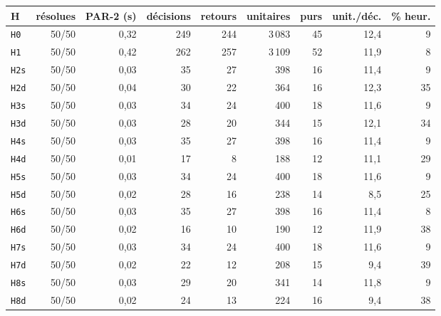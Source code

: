 \begin{tabular}{lrrrrrrrr}
\toprule
H & résolues & PAR-2 (s) & décisions & retours & unitaires & purs & unit./déc. & \% heur. \\
\midrule
\texttt{H0} & 50/50 & 0{,}32 & 249 & 244 & 3\,083 & 45 & 12{,}4 & 9 \\
\texttt{H1} & 50/50 & 0{,}42 & 262 & 257 & 3\,109 & 52 & 11{,}9 & 8 \\
\texttt{H2s} & 50/50 & 0{,}03 & 35 & 27 & 398 & 16 & 11{,}4 & 9 \\
\texttt{H2d} & 50/50 & 0{,}04 & 30 & 22 & 364 & 16 & 12{,}3 & 35 \\
\texttt{H3s} & 50/50 & 0{,}03 & 34 & 24 & 400 & 18 & 11{,}6 & 9 \\
\texttt{H3d} & 50/50 & 0{,}03 & 28 & 20 & 344 & 15 & 12{,}1 & 34 \\
\texttt{H4s} & 50/50 & 0{,}03 & 35 & 27 & 398 & 16 & 11{,}4 & 9 \\
\texttt{H4d} & 50/50 & 0{,}01 & 17 & 8 & 188 & 12 & 11{,}1 & 29 \\
\texttt{H5s} & 50/50 & 0{,}03 & 34 & 24 & 400 & 18 & 11{,}6 & 9 \\
\texttt{H5d} & 50/50 & 0{,}02 & 28 & 16 & 238 & 14 & 8{,}5 & 25 \\
\texttt{H6s} & 50/50 & 0{,}03 & 35 & 27 & 398 & 16 & 11{,}4 & 8 \\
\texttt{H6d} & 50/50 & 0{,}02 & 16 & 10 & 190 & 12 & 11{,}9 & 38 \\
\texttt{H7s} & 50/50 & 0{,}03 & 34 & 24 & 400 & 18 & 11{,}6 & 9 \\
\texttt{H7d} & 50/50 & 0{,}02 & 22 & 12 & 208 & 15 & 9{,}4 & 39 \\
\texttt{H8s} & 50/50 & 0{,}03 & 29 & 20 & 341 & 14 & 11{,}8 & 9 \\
\texttt{H8d} & 50/50 & 0{,}02 & 24 & 13 & 224 & 16 & 9{,}4 & 38 \\
\bottomrule
\end{tabular}
